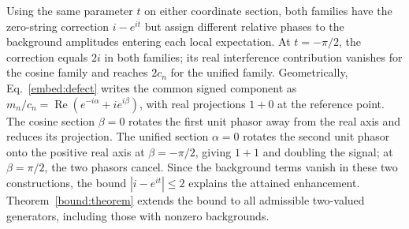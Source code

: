 Using the same parameter $t$ on either coordinate section, both families have the zero-string correction $i-e^{it}$ but assign different relative phases to the background amplitudes entering each local expectation. At $t=-\pi/2$, the correction equals $2i$ in both families; its real interference contribution vanishes for the cosine family and reaches $2c_n$ for the unified family. Geometrically, Eq.~\eqref{embed:defect} writes the common signed component as $m_n/c_n=\operatorname{Re}(e^{-i\alpha}+ie^{i\beta})$, with real projections $1+0$ at the reference point. The cosine section $\beta=0$ rotates the first unit phasor away from the real axis and reduces its projection. The unified section $\alpha=0$ rotates the second unit phasor onto the positive real axis at $\beta=-\pi/2$, giving $1+1$ and doubling the signal; at $\beta=\pi/2$, the two phasors cancel. Since the background terms vanish in these two constructions, the bound $|i-e^{it}|\le2$ explains the attained enhancement. Theorem~\ref{bound:theorem} extends the bound to all admissible two-valued generators, including those with nonzero backgrounds.
